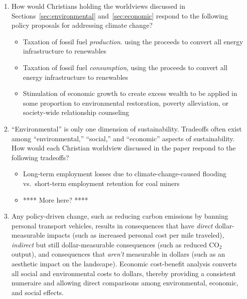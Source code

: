 \documentclass[12pt]{article}
\begin{document}
\begin{enumerate}
\begin{itemize}
		\end{itemize}
		
  \item How would Christians holding the worldviews discussed 
        in Sections~\ref{sec:environmental} and~\ref{sec:economic} 
		respond to the following policy proposals
		for addressing climate change?
		\begin{itemize}

		  \item Taxation of fossil fuel \emph{production}. using the proceeds to 
		        convert all energy infrastructure to renewables
		  
		  \item Taxation of fossil fuel \emph{consumption}, using the proceeds to 
		        convert all energy infrastructure to renewables

		  \item Stimulation of economic growth to create excess wealth to be applied 
		        in some proportion to environmental restoration, poverty alleviation,  
				or society-wide relationship counseling

		\end{itemize}
  \item ``Environmental'' is only one dimension of sustainability. 
        Tradeoffs often exist among ``environmental,'' ``social,'' and ``economic'' 
		aspects of sustainability. 
		How would each Christian worldview discussed in the paper respond to the following tradeoffs?
		\begin{itemize}

		  \item Long-term employment losses due to climate-change-caused flooding vs.\ 
		        short-term employment retention for coal miners

		  \item **** More here? **** 

		\end{itemize}
  \item Any policy-driven change, 
        such as reducing carbon emissions by banning personal transport vehicles, 
		results in consequences that have 
		\emph{direct} dollar-measurable impacts 
		(such as increased personal cost per mile traveled),
		\emph{indirect} but still dollar-measurable consequences 
		(such as reduced CO$_2$ output), and 
		consequences that \emph{aren't} measurable in dollars 
		(such as an aesthetic impact on the landscape). 
		Economic cost-benefit analysis converts all social and environmental costs 
		to dollars, thereby providing a consistent numeraire and allowing direct comparisons
		among environmental, economic, and social effects. 
		\begin{itemize}


\end{itemize}
\end{enumerate}
\end{document}
